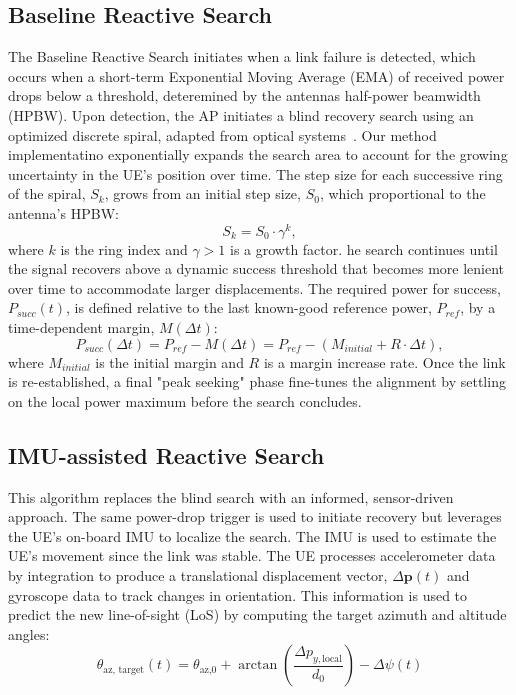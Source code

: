 \documentclass[fleqn,10pt]{wlscirep}
\begin{document}
\subsection*{Baseline Reactive Search}
The Baseline Reactive Search initiates when a link failure is detected, which occurs when a short-term Exponential Moving Average (EMA) of received power drops below a threshold, deteremined by the antennas half-power beamwidth (HPBW).
Upon detection, the AP initiates a blind recovery search using an optimized discrete spiral, adapted from optical systems~\cite{photonics11060540}. Our method implementatino exponentially expands the search area to account for the growing uncertainty in the UE's position over time. The step size for each successive ring of the spiral, $S_k$, grows from an initial step size, $S_0$, which proportional to the antenna's HPBW:
\begin{equation}
    S_k = S_0 \cdot \gamma^k,
\end{equation}
where $k$ is the ring index and $\gamma > 1$ is a growth factor.
he search continues until the signal recovers above a dynamic success threshold that becomes more lenient over time to accommodate larger displacements. The required power for success, $P_{succ}(t)$, is defined relative to the last known-good reference power, $P_{ref}$, by a time-dependent margin, $M(\Delta t)$:
\begin{equation}
    P_{succ}(\Delta t) = P_{ref} - M(\Delta t) = P_{ref} - (M_{initial} + R \cdot \Delta t),
\end{equation}
where $M_{initial}$ is the initial margin and $R$ is a margin increase rate. Once the link is re-established, a final "peak seeking" phase fine-tunes the alignment by settling on the local power maximum before the search concludes.

\subsection*{IMU-assisted Reactive Search}

This algorithm replaces the blind search with an informed, sensor-driven approach. The same power-drop trigger is used to initiate recovery but leverages the UE's on-board IMU to localize the search. The IMU is used to estimate the UE's movement since the link was stable. The UE processes accelerometer data by integration to produce a translational displacement vector, $\Delta\mathbf{p}(t)$ and gyroscope data to track changes in orientation. This information is used to predict the new line-of-sight (LoS) by computing the target azimuth and altitude angles: 
\begin{equation}
    \theta_{\text{az, target}}(t) = \theta_{\text{az,0}} + \arctan\left(\frac{\Delta p_{y, \text{local}}}{d_0}\right) - \Delta\psi(t)
\end{equation}
\end{document}
